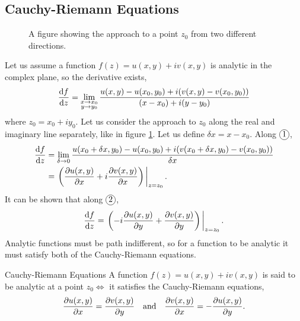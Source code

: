 \documentclass{book}
\DeclareMathOperator{\mRe}{Re}
\DeclareMathOperator{\mIm}{Im}
\newcommand*\circled[1]{\tikz[baseline=(char.base)]{
		\node[shape=circle,draw,minimum size=4mm, inner sep=0pt] (char)
		{\rule[-3pt]{0pt}{\dimexpr2ex+2pt}#1};}}
\begin{document}
\subsection{Cauchy-Riemann Equations}
\begin{figure}[h]
	\centering
	\caption{A figure showing the approach to a point $z_0$ from two different directions.}
	\label{fig:complex}
\end{figure}
Let us assume a function $f(z) = u(x,y) + iv(x,y)$ is analytic in the complex plane, so the derivative exists,
\begin{equation}
	\dv{f}{z}(z_0)= \lim_{\substack{x \to x_0 \\ y \to y_0}}\frac{u(x,y) - u(x_0,y_0) + i(v(x,y) - v(x_0,y_0))}{(x-x_0) + i(y - y_0)}
\end{equation}
where $z_0 = x_0 + iy_0$. Let us consider the approach to $z_0$ along the real and imaginary line separately, like in figure \ref{fig:complex}. Let us define $\delta x = x - x_0$. Along $\circled{1}$,
\begin{equation}
	\begin{split}
	\dv{f}{z}(z_0) &= \lim_{\delta \to 0}\frac{u(x_0 + \delta x, y_0) - u(x_0,y_0) + i(v(x_0 + \delta x, y_0) - v(x_0,y_0))}{\delta x} \\
	& = \eval{\left(\pdv{u(x,y)}{x} + i\pdv{v(x,y)}{x}\right)}_{z = z_0}.
	\end{split}
\end{equation}
It can be shown that along $\circled{2}$,
\begin{equation}
	\dv{f}{z}(z_0) = \eval{\left(-i\pdv{u(x,y)}{y} + \pdv{v(x,y)}{y}\right)}_{z = z_0}.
\end{equation}
Analytic functions must be path indifferent, so for a function to be analytic it must satisfy both of the Cauchy-Riemann equations.
\begin{Theorems}{Cauchy-Riemann Equations}{}
	A function $f(z) = u(x,y) + iv(x,y)$ is said to be analytic at a point $z_0 \iff$ it satisfies the Cauchy-Riemann equations,
	\begin{align}
		\pdv{u(x,y)}{x} = \pdv{v(x,y)}{y} && \text{and} && \pdv{v(x,y)}{x} = -\pdv{u(x,y)}{y}.
	\end{align}
\end{Theorems}
\end{document}
